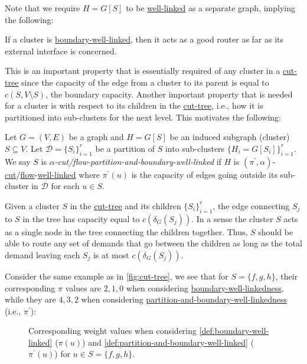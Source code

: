 Note that we require \(H = G[S]\) to be \hyperref[def:well-linked]{well-linked} as a separate graph, implying the following:

\begin{intuition}
	If a cluster is \hyperref[def:boundary-well-linked]{boundary-well-linked}, then it acts as a good router as far as its external interface is concerned.
\end{intuition}

This is an important property that is essentially required of any cluster in a \hyperref[def:cut-tree]{cut-tree} since the capacity of the edge from a cluster to its parent is equal to \(c(S, V\setminus S)\), the boundary capacity. Another important property that is needed for a cluster is with respect to its children in the \hyperref[def:cut-tree]{cut-tree}, i.e., how it is partitioned into sub-clusters for the next level. This motivates the following:

\begin{definition}\label{def:partition-and-boundary-well-linked}
	Let \(G = (V, E)\) be a graph and \(H = G[S]\) be an induced subgraph (cluster) \(S \subseteq V\). Let \(\mathcal{D} = \{ S_i \} _{i=1}^{r}\) be a partition of \(S\) into sub-clusters \(\{ H_i = G[S_i]\} _{i=1}^{r}\). We say \(S\) is \emph{\(\alpha \)-cut/flow-partition-and-boundary-well-linked} if \(H\) is \((\pi ^{\prime} , \alpha )\)-\hyperref[def:cut-well-linked]{cut}/\hyperref[def:flow-well-linked]{flow}-\hyperref[def:cut-flow-well-linked]{well-linked} where \(\pi ^{\prime} (u)\) is the capacity of edges going outside its sub-cluster in \(\mathcal{D} \) for each \(u \in S\).
\end{definition}

\begin{intuition}
	Given a cluster \(S\) in the \hyperref[def:cut-tree]{cut-tree} and its children \(\{ S_i \} _{i=1}^{r}\), the edge connecting \(S_j\) to \(S\) in the tree has capacity equal to \(c(\delta _G(S_j))\). In a sense the cluster \(S\) acts as a single node in the tree connecting the children together. Thus, \(S\) should be able to route any set of demands that go between the children as long as the total demand leaving each \(S_j\) is at most \(c(\delta _G(S_j))\).
\end{intuition}

Consider the same example as in \autoref{fig:cut-tree}, we see that for \(S = \{ f, g, h \} \), their corresponding \(\pi \) values are \(2, 1, 0\) when considering \hyperref[def:boundary-well-linked]{boundary-well-linkedness}, while they are \(4, 3, 2\) when considering \hyperref[def:partition-and-boundary-well-linked]{partition-and-boundary-well-linkedness} (i.e., \(\pi ^{\prime} \)):
\begin{figure}[H]
	\centering
	\caption{Corresponding weight values when considering \autoref{def:boundary-well-linked} (\(\pi (u)\)) and \autoref{def:partition-and-boundary-well-linked} (\(\pi ^{\prime} (u)\)) for \(u \in S = \{ f, g, h \} \).}
	\label{fig:boundary-and-partition-well-linked-cut-tree}
\end{figure}

